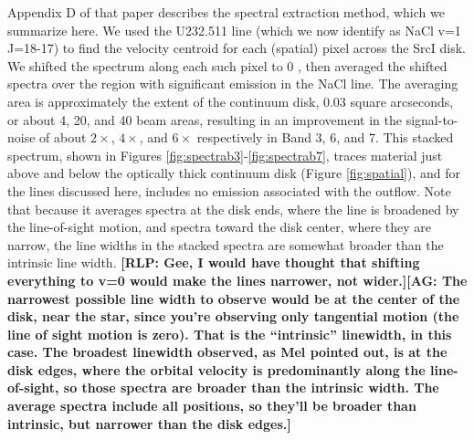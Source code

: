 \documentclass[twocolumn]{aastex62}
\newcommand{\sourcei}{SrcI\xspace}
\newcommand{\rlp}[1]{\textcolor{blue!65!black}{\textbf{[RLP: #1]}}}
\newcommand{\ag}[1]{\textcolor{red!65!black}{\textbf{[AG: #1]}}}
\begin{document}
Appendix D of that paper describes the spectral extraction method,
which we summarize here.  We used the U232.511 line (which we now identify as
NaCl v=1 J=18-17) to find the velocity centroid for each (spatial) pixel
across the \sourcei disk.  We shifted the spectrum along
each such pixel to 0 \kms, then averaged the shifted spectra over the region with
significant emission in the NaCl line.  
The
averaging area is approximately the extent of the continuum disk, 0.03 square
arcseconds, or about 4, 20, and 40  beam areas, resulting
in an improvement in the signal-to-noise of about $2\times$, $4\times$, and $6\times$
respectively in Band 3, 6, and 7.
This stacked spectrum, shown in Figures \ref{fig:spectrab3}-\ref{fig:spectrab7},
traces material just above and below the optically thick continuum disk
(Figure \ref{fig:spatial}), and for the lines discussed here, includes no
emission associated with the outflow.  Note that because it averages spectra
at the disk ends, where the line is broadened by the line-of-sight motion,
and spectra toward the disk center, where they are narrow, the line widths
in the stacked spectra are somewhat broader than the intrinsic line width.
\rlp{Gee, I would have thought that shifting everything to v=0 would make
the lines narrower, not wider.}\ag{The narrowest possible line width to observe
would be at the center of the disk, near the star, since you're observing only
tangential motion (the line of sight motion is zero).  That is the ``intrinsic''
linewidth, in this case.  The broadest linewidth observed, as Mel pointed out,
is at the disk edges, where the orbital velocity is predominantly along the line-of-sight,
so those spectra are broader than the intrinsic width.  The average spectra include
all positions, so they'll be broader than intrinsic, but narrower than the disk edges.}
\end{document}
